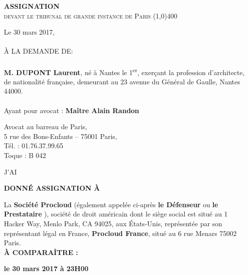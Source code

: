 \documentclass[12pt,a4paper]{article}
\title{}
\author{}
\date{}
\newenvironment{changemargin}[2]{%
\begin{list}{}{%
\setlength{\topsep}{0pt}%
\setlength{\leftmargin}{#1}%
\setlength{\rightmargin}{#2}%
\setlength{\listparindent}{\parindent}%
\setlength{\itemindent}{\parindent}%
\setlength{\parsep}{\parskip}
}%
\item[]}{\end{list}}
\begin{document}

\setlength{\parindent}{0cm}   %

\begin{center}
\huge{\textbf{ASSIGNATION} \\\large{\textsc{devant le tribunal de grande instance de Paris}}}
\line(1,0){400}
\end{center}

\vspace{0.5cm}

Le 30 mars 2017,\\\\
À LA DEMANDE DE:\\\\
\textbf{M. DUPONT Laurent}, né à Nantes le 1\textsuperscript{er}, exerçant la profession d'architecte, de nationalité française, demeurant au 23 avenue du Général de Gaulle, Nantes 44000.\\\\

Ayant pour avocat : \textbf{Maître Alain Randon}
\begin{changemargin}{3.7cm}{0.5cm}     %
Avocat au barreau de Paris,\\5 rue des Bons-Enfants -- 75001 Paris,\\Tél. : 01.76.37.99.65\\ Toque : B 042\\
\end{changemargin}

J'AI

\begin{center}
\large{\textbf{DONNÉ ASSIGNATION À}}
\end{center}

La \textbf{Société Procloud} (également appelée ci-après \og \textbf{le Défenseur}  \fg{} ou \og \textbf{le Prestataire} \fg{}), société de droit américain dont le siège social est situé au 1 Hacker Way, Menlo Park, CA 94025, aux États-Unis, représentée par son représentant légal en France, \textbf{Procloud France}, situé au 6 rue Menars 75002 Paris.\\

\textbf{À COMPARAÎTRE :}

\begin{center}
\textbf{le 30 mars 2017 à 23H00}
\end{center}
\end{document}
